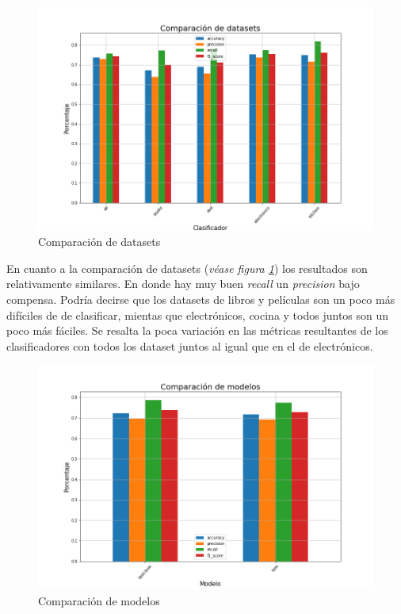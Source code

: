 \begin{figure}[H]
    \centering
    \includegraphics[scale = 0.45]{results/datasets_comparison.png}
    \caption{Comparación de datasets}
    \label{fig:dataset_comparisson}
\end{figure}

En cuanto a la comparación de datasets (\textit{véase figura \ref{fig:dataset_comparisson}}) los resultados son relativamente similares. En donde hay muy buen \textit{recall} un \textit{precision} bajo compensa. Podría decirse que los datasets de libros y películas son un poco más difíciles de de clasificar, mientas que electrónicos, cocina y todos juntos son un poco más fáciles. Se resalta la poca variación en las métricas resultantes de los clasificadores con todos los dataset juntos al igual que en el de electrónicos.

\begin{figure}[H]
    \centering
    \includegraphics[scale = 0.45]{results/model_comparison.png}
    \caption{Comparación de modelos}
    \label{fig:model_comparisson}
\end{figure}

